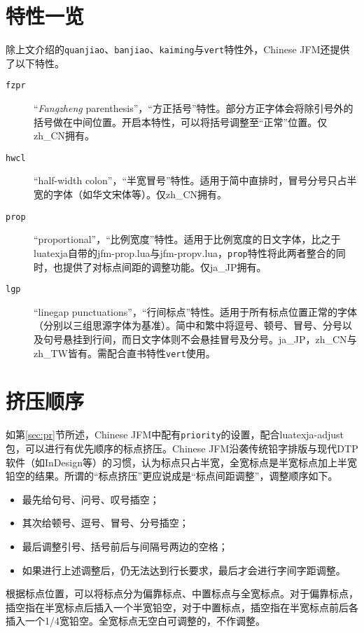 \documentclass[a4paper , zihao=-4 , fontset=adobe , punct=zh_CN/kaiming]{ctexart}
\begin{document}
\section{特性一览}
除上文介绍的\+\verb|quanjiao|、\verb|banjiao|、\verb|kaiming|与\+\verb|vert|特性外，\textsf{Chinese JFM}还提供了以下特性。

\begin{description}
    \item[\texttt{fzpr}] “\textit{Fangzheng} parenthesis”，“方正括号”特性。部分方正字体会将除引号外的括号做在中间位置。开启本特性，可以将括号调整至“正常”位置。仅\textsf{zh\_CN}拥有。
    \item[\texttt{hwcl}] “half-width colon”，“半宽冒号”特性。适用于简中直排时，冒号分号只占半宽的字体（如华文宋体等）。仅\textsf{zh\_CN}拥有。
    \item[\texttt{prop}] “proportional”，“比例宽度”特性。适用于比例宽度的日文字体，比之于\textsf{lua\-texja}自带的\textsf{jfm-prop.lua}与\textsf{jfm-propv.lua}，\verb|prop|特性将此两者整合的同时，也提供了对标点间距的调整功能。仅\textsf{ja\_JP}拥有。
    \item[\texttt{lgp}] “linegap punctuations”，“行间标点”特性。适用于所有标点位置正常的字体（分别以三组思源字体为基准）。简中和繁中将逗号、顿号、冒号、分号以及句号悬挂到行间，而日文字体则不会悬挂冒号及分号。\textsf{ja\_JP}，\textsf{zh\_CN}与\textsf{zh\_TW}皆有。需配合直书特性\verb|vert|使用。
\end{description}

\section{挤压顺序}
如第\ref{sec:pr}节所述，\textsf{Chinese JFM}中配有\+\verb|priority|的设置，配合\textsf{luatexja-adjust}包，可以进行有优先顺序的标点挤压。\textsf{Chinese JFM}沿袭传统铅字排版与现代DTP软件（如InDesign等）的习惯，认为标点只占半宽，全宽标点是半宽标点加上半宽铅空的结果。所谓的“标点挤压”更应说成是“标点间距调整”，调整顺序如下。
\begin{itemize}
    \item 最先给句号、问号、叹号插空；
    \item 其次给顿号、逗号、冒号、分号插空；
    \item 最后调整引号、括号前后与间隔号两边的空格；
    \item 如果进行上述调整后，仍无法达到行长要求，最后才会进行字间字距调整。
\end{itemize}

根据标点位置，可以将标点分为偏靠标点、中置标点与全宽标点。对于偏靠标点，插空指在半宽标点后插入一个半宽铅空，对于中置标点，插空指在半宽标点前后各插入一个1/4宽铅空。全宽标点无空白可调整的，不作调整。
\end{document}
